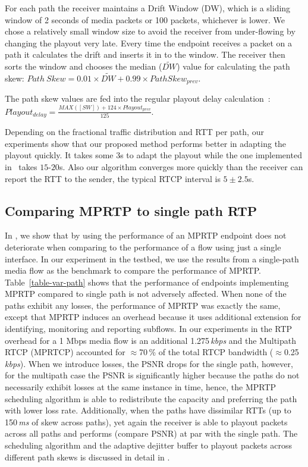 For each path the receiver maintains a Drift Window (DW), which is a sliding
window of 2 seconds of media packets or 100 packets, whichever is lower. We
chose a relatively small window size to avoid the receiver from under-flowing
by changing the playout very late. Every time the endpoint receives a packet
on a path it calculates the drift and inserts it in to the window. The
receiver then sorts the window and chooses the median ($\widetilde{DW}$) value
for calculating the path skew: $Path\ Skew = 0.01 \times \widetilde{DW} + 0.99
\times PathSkew_{prev}$. 

The path skew values are fed into the regular playout delay
calculation~\cite{Fober05,Colin03}: $Playout_{delay} = \frac{MAX([SW]) + 124
\times Playout_{prev}}{125}$.

Depending on the fractional traffic distribution and RTT per path, our
experiments show that our proposed method performs better in adapting the
playout quickly. It takes some 3s to adapt the playout while the one
implemented in~\cite{Fober05,Colin03} takes $15$-$20$s. Also our algorithm
converges more quickly than the receiver can report the RTT to the sender, the
typical RTCP interval is $5\pm2.5$s.

\subsection{Comparing MPRTP to single path RTP}

In , we show that by using the performance of an MPRTP
endpoint does not deteriorate when comparing to the performance of a flow
using just a single interface. In our experiment in the testbed, we use the
results from a single-path media flow as the benchmark to compare the
performance of MPRTP. Table~\ref{table-var-path} shows that the performance of
endpoints implementing MPRTP compared to single path is not adversely
affected. When none of the paths exhibit any losses, the performance of MPRTP
was exactly the same, except that MPRTP induces an overhead because it uses
additional extension for identifying, monitoring and reporting subflows. In
our experiments in  the RTP overhead for a 1 Mbps media flow
is an additional 1.275\,\emph{kbps} and the Multipath RTCP (MPRTCP) accounted
for $\approx$70\,\% of the total RTCP bandwidth ($\approx$0.25\,\emph{kbps}).
When we introduce losses, the PSNR drops for the single path, however, for the
multipath case the PSNR is significantly higher because the paths do not
necessarily exhibit losses at the same instance in time, hence, the MPRTP
scheduling algorithm is able to redistribute the capacity and preferring the
path with lower loss rate. Additionally, when the paths have dissimilar RTTs
(up to 150\,\emph{ms} of skew across paths), yet again the receiver is able to
playout packets across all paths and performs (compare PSNR) at par with the
single path. The scheduling algorithm and the adaptive dejitter buffer to
playout packets across different path skews is discussed in detail in
.

